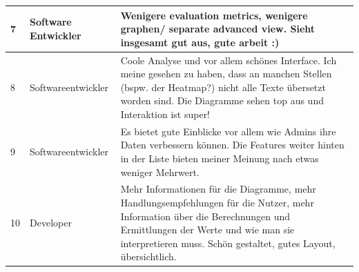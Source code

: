 \documentclass[
	english,
	ruledheaders=section,%
	class=report,%
	thesis={type=bachelor},%
	accentcolor=1b,%
	custommargins=true,%
	marginpar=false,%
	parskip=half-,%
	fontsize=11pt,%
	DIV=14,
]{tudapub}
\begin{document}
\begin{longtable}{l >{\RaggedRight}p{3cm} >{\RaggedRight}p{10cm}}
    \midrule
    7 & Software Entwickler & Wenigere evaluation metrics, wenigere graphen/ separate advanced view. Sieht insgesamt gut aus, gute arbeit :) \\
    \midrule
    8 & Softwareentwickler & Coole Analyse und vor allem schönes Interface. Ich meine gesehen zu haben, dass an manchen Stellen (bspw. der Heatmap?) nicht alle Texte übersetzt worden sind. Die Diagramme sehen top aus und Interaktion ist super! \\
    \midrule
    9 & Softwareentwickler & Es bietet gute Einblicke vor allem wie Admins ihre Daten verbessern können. Die Features weiter hinten in der Liste bieten meiner Meinung nach etwas weniger Mehrwert. \\
    \midrule
    10 & Developer & Mehr Informationen für die Diagramme, mehr Handlungsempfehlungen für die Nutzer, mehr Information über die Berechnungen und Ermittlungen der Werte und wie man sie interpretieren muss. Schön gestaltet, gutes Layout, übersichtlich. \\
\end{longtable}
\end{document}
